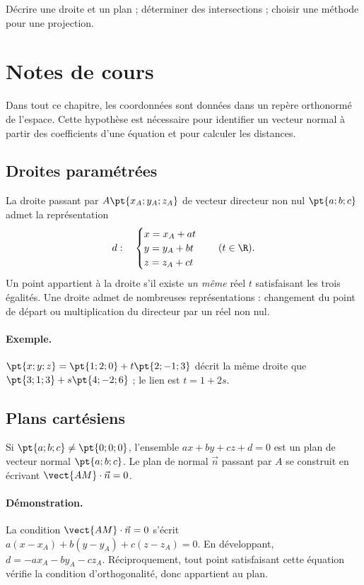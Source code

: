 \label{ch:12}


\begin{keypoint}[Objectifs]Décrire une droite et un plan ; déterminer des intersections ; choisir une méthode pour une projection.\end{keypoint}

\section{Notes de cours}
Dans tout ce chapitre, les coordonnées sont données dans un repère orthonormé de l'espace. Cette hypothèse est nécessaire pour identifier un vecteur normal à partir des coefficients d'une équation et pour calculer les distances.
\subsection{Droites paramétrées}
La droite passant par $A\pt{x_A;y_A;z_A}$ de vecteur directeur non nul $\pt{a;b;c}$ admet la représentation
\[d:\quad\begin{cases}x=x_A+at\\y=y_A+bt\\z=z_A+ct\end{cases}\quad(t\in\R).\]
Un point appartient à la droite s'il existe \emph{un même} réel $t$ satisfaisant les trois égalités. Une droite admet de nombreuses représentations : changement du point de départ ou multiplication du directeur par un réel non nul.
\paragraph{Exemple.} $\pt{x;y;z}=\pt{1;2;0}+t\pt{2;-1;3}$ décrit la même droite que $\pt{3;1;3}+s\pt{4;-2;6}$ ; le lien est $t=1+2s$.
\subsection{Plans cartésiens}
\begin{keypoint}
Si $\pt{a;b;c}\ne\pt{0;0;0}$, l'ensemble $ax+by+cz+d=0$ est un plan de vecteur normal $\pt{a;b;c}$. Le plan de normal $\vec n$ passant par $A$ se construit en écrivant $\vect{AM}\cdot\vec n=0$.
\end{keypoint}
\paragraph{Démonstration.} La condition $\vect{AM}\cdot\vec n=0$ s'écrit $a(x-x_A)+b(y-y_A)+c(z-z_A)=0$. En développant, $d=-ax_A-by_A-cz_A$. Réciproquement, tout point satisfaisant cette équation vérifie la condition d'orthogonalité, donc appartient au plan.
